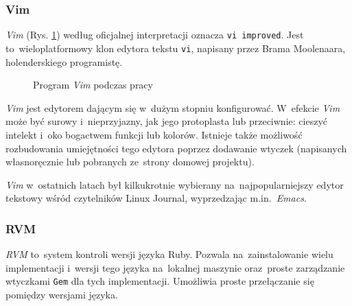 \subsubsection{Vim}

\textit{Vim} \cite{vim} (Rys. \ref{tool.vim}) według oficjalnej interpretacji oznacza \texttt{vi improved}. Jest to~wieloplatformowy klon edytora tekstu \texttt{vi}, napisany przez Brama Moolenaara, holenderskiego programistę.

\begin{figure}[ht]
\centering
{}
\caption{Program \textit{Vim} podczas pracy}
\label{tool.vim}
\end{figure}

\textit{Vim} jest edytorem dającym się w~dużym stopniu konfigurować. W~efekcie \textit{Vim} może być surowy i~nieprzyjazny, jak jego protoplasta lub przeciwnie: cieszyć intelekt i~oko bogactwem funkcji lub kolorów. Istnieje także możliwość rozbudowania umiejętności tego edytora poprzez dodawanie wtyczek (napisanych własnoręcznie lub pobranych ze~strony domowej projektu).


\textit{Vim} w~ostatnich latach był kilkukrotnie wybierany na~najpopularniejszy edytor tekstowy wśród czytelników Linux Journal, wyprzedzając m.in.~\textit{Emacs}.

\subsubsection{RVM}

\textit{RVM} \cite{rvm} to~system kontroli wersji języka Ruby. Pozwala na~zainstalowanie wielu implementacji i~wersji tego języka na~lokalnej maszynie oraz~proste zarządzanie wtyczkami \texttt{Gem} dla tych implementacji. Umożliwia proste przełączanie się pomiędzy wersjami języka.


